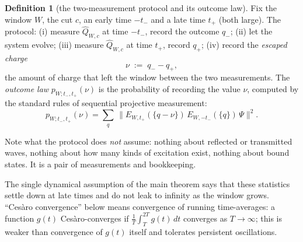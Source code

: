 \documentclass[11pt]{article}
\theoremstyle{definition}
\newtheorem{definition}[theorem]{Definition}
\theoremstyle{remark}
\begin{document}
\begin{definition}[the two-measurement protocol and its outcome law]
\label{def:tpm}
Fix the window $W$, the cut $c$, an early time $-t_-$ and a late time $t_+$
(both large).  The protocol: (i) measure $\widehat{Q}_{W,c}$ at time $-t_-$,
record the outcome $q_-$; (ii) let the system evolve; (iii) measure
$\widehat{Q}_{W,c}$ at time $t_+$, record $q_+$; (iv) record the
\emph{escaped charge}
\[
\nu\;:=\;q_- - q_+ ,
\]
the amount of charge that left the window between the two measurements.  The
\emph{outcome law} $p_{W;t_-,t_+}(\nu)$ is the probability of recording the
value $\nu$, computed by the standard rules of sequential projective
measurement:
\[
p_{W;t_-,t_+}(\nu)=\sum_{q}\,
\bigl\|E_{W,t_+}(\{q-\nu\})\,E_{W,-t_-}(\{q\})\,\Psi\bigr\|^{2}.
\]
\end{definition}

Note what the protocol does \emph{not} assume: nothing about reflected or
transmitted waves, nothing about how many kinds of excitation exist, nothing
about bound states.  It is a pair of measurements and bookkeeping.

The single dynamical assumption of the main theorem says that these
statistics settle down at late times and do not leak to infinity as the
window grows.  ``Ces\`aro convergence'' below means convergence of running
time-averages: a function $g(t)$ Ces\`aro-converges if
$\frac{1}{T}\int_{T}^{2T}g(t)\,dt$ converges as $T\to\infty$; this is weaker
than convergence of $g(t)$ itself and tolerates persistent oscillations.
\end{document}
